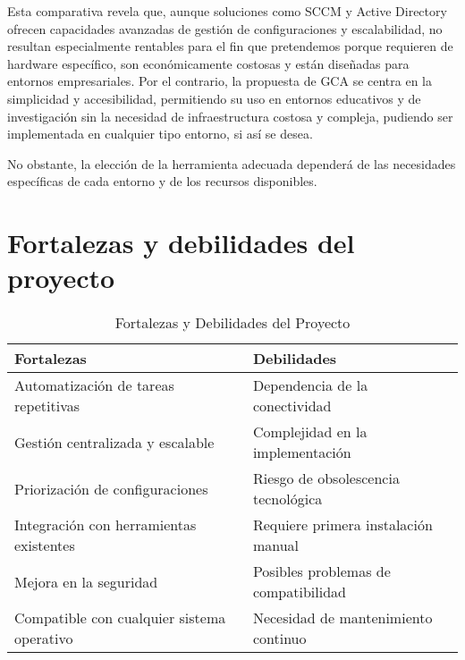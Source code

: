 Esta comparativa revela que, aunque soluciones como SCCM y Active Directory ofrecen capacidades avanzadas de gestión de
configuraciones y escalabilidad, no resultan especialmente rentables para el fin que pretendemos porque requieren de
hardware específico, son económicamente costosas y están diseñadas para entornos empresariales.
Por el contrario, la propuesta de GCA se centra en la simplicidad y accesibilidad, permitiendo su uso en entornos educativos
y de investigación sin la necesidad de infraestructura costosa y compleja, pudiendo ser implementada en cualquier
tipo entorno, si así se desea.

No obstante, la elección de la herramienta adecuada dependerá de las necesidades específicas de cada entorno y de los
recursos disponibles.

\section{Fortalezas y debilidades del proyecto}\label{sec:fortalezas-y-debilidades-del-proyecto}

\begin{table}[ht]
    \centering
    \begin{tabular}{@{}p{6cm} p{6cm}@{}}
        \toprule
        \textbf{Fortalezas} & \textbf{Debilidades} \\
        \midrule
        Automatización de tareas repetitivas & Dependencia de la conectividad \\
        Gestión centralizada y escalable & Complejidad en la implementación \\
        Priorización de configuraciones & Riesgo de obsolescencia tecnológica \\
        Integración con herramientas existentes & Requiere primera instalación manual \\
        Mejora en la seguridad & Posibles problemas de compatibilidad \\
        Compatible con cualquier sistema operativo & Necesidad de mantenimiento continuo \\
        \bottomrule
    \end{tabular}
    \caption{Fortalezas y Debilidades del Proyecto}
    \label{tab:fortalezas-debilidades}
\end{table}